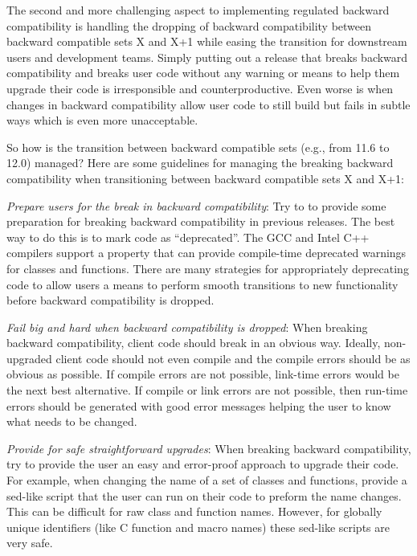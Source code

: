 \documentclass[11pt]{SANDreport}
\begin{document}
The second and more challenging aspect to implementing regulated
backward compatibility is handling the dropping of backward
compatibility between backward compatible sets X and X+1 while easing
the transition for downstream users and development teams.  Simply
putting out a release that breaks backward compatibility and breaks
user code without any warning or means to help them upgrade their code
is irresponsible and counterproductive.  Even worse is when changes in
backward compatibility allow user code to still build but fails in
subtle ways which is even more unacceptable.

So how is the transition between backward compatible sets (e.g., from
11.6 to 12.0) managed?  Here are some guidelines for managing the
breaking backward compatibility when transitioning between backward
compatible sets X and X+1:

\begin{compactitem}

{}\item\textit{Prepare users for the break in backward compatibility}:
Try to to provide some preparation for breaking backward compatibility
in previous releases.  The best way to do this is to mark code as
``deprecated''.  The GCC and Intel C++ compilers support a
{} property that can provide compile-time
deprecated warnings for classes and functions.  There are many
strategies for appropriately deprecating code to allow users a means
to perform smooth transitions to new functionality before backward
compatibility is dropped.

{}\item\textit{Fail big and hard when backward compatibility is
dropped}: When breaking backward compatibility, client code should
break in an obvious way.  Ideally, non-upgraded client code should not
even compile and the compile errors should be as obvious as possible.
If compile errors are not possible, link-time errors would be the next
best alternative.  If compile or link errors are not possible, then
run-time errors should be generated with good error messages helping
the user to know what needs to be changed.

{}\item\textit{Provide for safe straightforward upgrades}: When
breaking backward compatibility, try to provide the user an easy and
error-proof approach to upgrade their code.  For example, when
changing the name of a set of classes and functions, provide a
sed-like script that the user can run on their code to preform the
name changes.  This can be difficult for raw class and function names.
However, for globally unique identifiers (like C function and macro
names) these sed-like scripts are very safe.

\end{compactitem}
\end{document}

